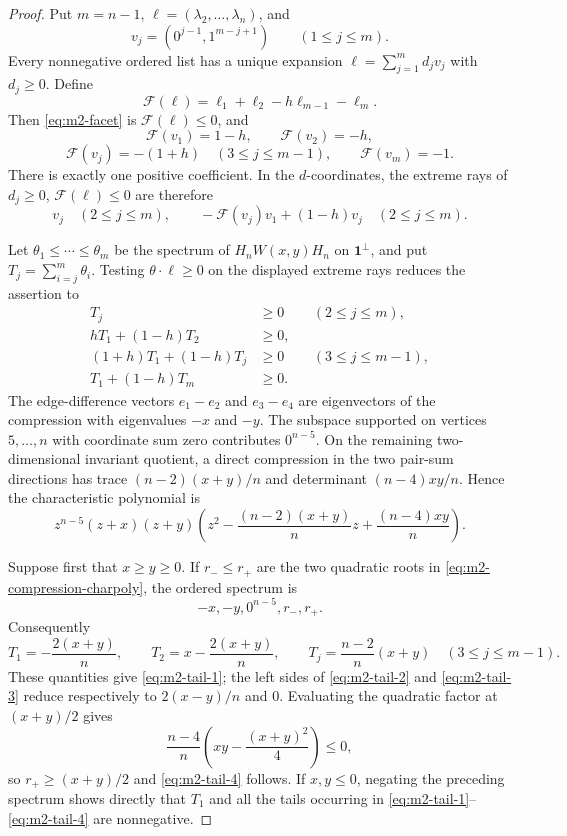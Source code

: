 \documentclass[11pt,reqno]{amsart}
\theoremstyle{definition}
\theoremstyle{remark}
\newcommand{\one}{\mathbf 1}
\begin{document}
\begin{proof}
Put $m=n-1$, $\ell=(\lambda_2,\ldots,\lambda_n)$, and
\[
  v_j=(0^{j-1},1^{m-j+1})\qquad(1\le j\le m).
\]
Every nonnegative ordered list has a unique expansion
$\ell=\sum_{j=1}^m d_jv_j$ with $d_j\ge0$.  Define
\[
  \mathcal F(\ell)=\ell_1+\ell_2-h\ell_{m-1}-\ell_m.
\]
Then \eqref{eq:m2-facet} is $\mathcal F(\ell)\le0$, and
\[
 \mathcal F(v_1)=1-h,\qquad \mathcal F(v_2)=-h,
\]
\[
 \mathcal F(v_j)=-(1+h)\quad(3\le j\le m-1),
 \qquad \mathcal F(v_m)=-1.
\]
There is exactly one positive coefficient.  In the $d$-coordinates, the
extreme rays of $d_j\ge0$, $\mathcal F(\ell)\le0$ are therefore
\[
 v_j\quad(2\le j\le m),
 \qquad
 -\mathcal F(v_j)v_1+(1-h)v_j\quad(2\le j\le m).
\]

Let $\theta_1\le\cdots\le\theta_m$ be the spectrum of
$H_nW(x,y)H_n$ on $\one^\perp$, and put
$T_j=\sum_{i=j}^m\theta_i$.  Testing $\theta\cdot\ell\ge0$ on the displayed
extreme rays reduces the assertion to
\begin{align}
 T_j&\ge0 &&(2\le j\le m),\label{eq:m2-tail-1}\\
 hT_1+(1-h)T_2&\ge0,\label{eq:m2-tail-2}\\
 (1+h)T_1+(1-h)T_j&\ge0 &&(3\le j\le m-1),
 \label{eq:m2-tail-3}\\
 T_1+(1-h)T_m&\ge0.\label{eq:m2-tail-4}
\end{align}
The edge-difference vectors $e_1-e_2$ and $e_3-e_4$ are eigenvectors of
the compression with eigenvalues $-x$ and $-y$.  The subspace supported on
vertices $5,\ldots,n$ with coordinate sum zero contributes $0^{n-5}$.
On the remaining two-dimensional invariant quotient, a direct compression
in the two pair-sum directions has trace $(n-2)(x+y)/n$ and determinant
$(n-4)xy/n$.  Hence the characteristic polynomial is
\begin{equation}\label{eq:m2-compression-charpoly}
 z^{n-5}(z+x)(z+y)
 \left(z^2-\frac{(n-2)(x+y)}n z+\frac{(n-4)xy}{n}\right).
\end{equation}

Suppose first that $x\ge y\ge0$.  If $r_-\le r_+$ are the two quadratic
roots in \eqref{eq:m2-compression-charpoly}, the ordered spectrum is
\[
 -x,-y,0^{n-5},r_-,r_+.
\]
Consequently
\[
 T_1=-\frac{2(x+y)}n,\qquad
 T_2=x-\frac{2(x+y)}n,\qquad
 T_j=\frac{n-2}{n}(x+y)\quad(3\le j\le m-1).
\]
These quantities give \eqref{eq:m2-tail-1}; the left sides of
\eqref{eq:m2-tail-2} and \eqref{eq:m2-tail-3} reduce respectively to
$2(x-y)/n$ and $0$.  Evaluating the quadratic factor at $(x+y)/2$ gives
\[
 \frac{n-4}{n}\left(xy-\frac{(x+y)^2}{4}\right)\le0,
\]
so $r_+\ge(x+y)/2$ and \eqref{eq:m2-tail-4} follows.  If $x,y\le0$,
negating the preceding spectrum shows directly that $T_1$ and all the
tails occurring in \eqref{eq:m2-tail-1}--\eqref{eq:m2-tail-4} are
nonnegative.


\end{proof}
\end{document}
